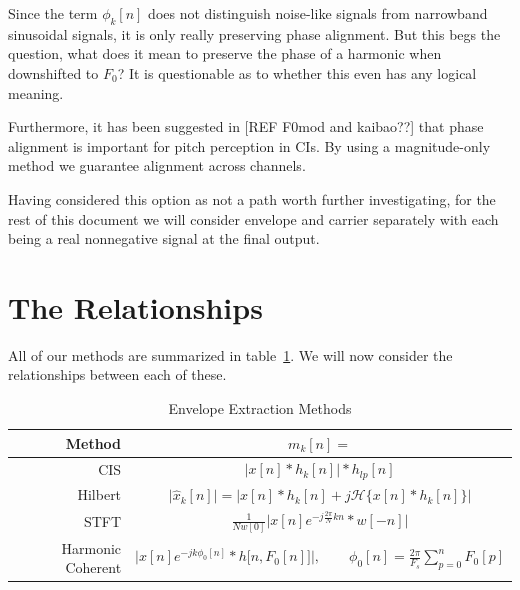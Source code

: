 \documentclass [11pt, proquest] {uwthesis}[2015/03/03]
\begin{document}
Since the term $\phi_k[n]$ does not distinguish noise-like signals from narrowband sinusoidal signals, it is only really preserving phase alignment.  But this begs the question, what does it mean to preserve the phase of a harmonic when downshifted to $F_0$?  It is questionable as to whether this even has any logical meaning.


Furthermore, it has been suggested in [REF F0mod and kaibao??] that phase alignment is important for pitch perception in CIs.  By using a magnitude-only method we guarantee alignment across channels.


Having considered this option as not a path worth further investigating, for the rest of this document we will consider envelope and carrier separately with each being a real nonnegative signal at the final output.

\section{The Relationships}

All of our methods are summarized in table~\ref{table:envelope_extraction_methods}.  We will now consider the relationships between each of these.

\begin{table}
\begin{center}
\begin{tabular}{| r | c |}
  \hline
  \textbf{Method} & $m_k[n] = $ \\ \hline
  CIS & $\Big| x[n] * h_k[n] \Big| * h_{lp}[n]$ \\ \hline
  Hilbert & $\Big| \widehat{x}_k[n] \Big| = \Big| x[n] * h_k[n] + j\mathcal{H}\{x[n] * h_k[n]\} \Big|$ \\ \hline
  STFT & $\frac{1}{Nw[0]}  \Big\vert x[n] e^{-j\frac{2\pi}{N}kn} * w[-n] \Big\vert$ \\ \hline
  Harmonic Coherent & $\Big| x[n] e^{-jk\phi_0 [n]} * h\big[n, F_0[n] \big] \Big|, \qquad \phi_0[n] = \frac{2\pi}{F_s} \sum_{p=0}^{n} F_0[p]$ \\ \hline
\end{tabular}
\end{center}
\caption{Envelope Extraction Methods}\label{table:envelope_extraction_methods}
\end{table}
\end{document}
